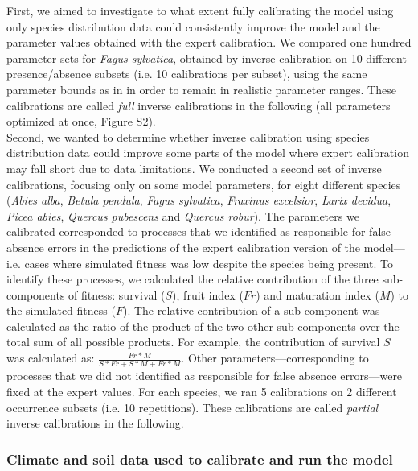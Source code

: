 \documentclass[preprint,12pt,authoryear]{elsarticle}
\begin{document}
\textcolor{customred}{First, we aimed to investigate to what extent fully calibrating the model using only species distribution data could consistently improve the model and the parameter values obtained with the expert calibration. We compared one hundred parameter sets for \emph{Fagus sylvatica}, obtained by inverse calibration on 10 different presence/absence subsets (i.e. 10 calibrations per subset),} using the same parameter bounds as in \citet{VanderMeersch2023} in order to remain in realistic parameter ranges. These calibrations are called \emph{full} inverse calibrations in the following (all parameters optimized at once, Figure S2). \\
\textcolor{customred}{Second, we wanted to determine whether inverse calibration using species distribution data could improve some parts of the model where expert calibration may fall short due to data limitations. We conducted a second set of inverse calibrations, focusing only on some model parameters, for eight different species} (\emph{Abies alba}, \emph{Betula pendula}, \emph{Fagus sylvatica}, \emph{Fraxinus excelsior}, \emph{Larix decidua}, \emph{Picea abies}, \emph{Quercus pubescens} and \emph{Quercus robur}). The parameters we calibrated corresponded to processes that we identified as responsible for false absence errors in the predictions of the expert calibration version of the model---i.e. cases where simulated fitness was low despite the species being present. To identify these processes, we calculated the relative contribution of the three sub-components of fitness: survival ($S$), fruit index ($Fr$) and maturation index ($M$) to the simulated fitness ($F$). The relative contribution of a \textcolor{customred}{sub-component} was calculated as the ratio of the product of the two other \textcolor{customred}{sub-components} over the total sum of all possible products. For example, the contribution of survival $S$ was calculated as: $\frac{Fr*M}{S*Fr+S*M+Fr*M}$. Other parameters---corresponding to processes that we did not identified as responsible for false absence errors---were fixed at the expert values. For each species, we ran 5 calibrations on 2 different occurrence subsets (i.e. 10 repetitions). These calibrations are called \emph{partial} inverse calibrations in the following. 

\subsubsection{Climate and soil data used to calibrate and run the model}
\end{document}

